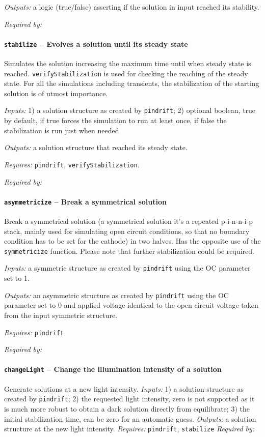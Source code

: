 \textit{Outputs:} a logic (true/false) asserting if the solution in input reached its stability.


\textit{Required by:} 

		\paragraph{\texttt{stabilize} -- Evolves a solution until its steady state}
Simulates the solution increasing the maximum time until when steady state is reached. 
\texttt{verifyStabilization} is used for checking the reaching of the steady state.
For all the simulations including transients, the stabilization of the starting solution is of utmost importance.

\textit{Inputs:} 1) a solution structure as created by \texttt{pindrift};
   2) optional boolean, true by default, 
     if true forces the simulation to run at least once, if false the
     stabilization is run just when needed.
     
\textit{Outputs:} a solution structure that reached its steady state.

\textit{Requires:} \texttt{pindrift}, \texttt{verifyStabilization}.

\textit{Required by:} 

		\paragraph{\texttt{asymmetricize} -- Break a symmetrical solution}
		Break a symmetrical solution (a symmetrical solution it's a repeated p-i-n-n-i-p stack, mainly used for simulating open circuit conditions, so that no boundary condition has to be set for the cathode) in two halves. Has the opposite use of the \texttt{symmetricize} function.
		Please note that further stabilization could be required.
		
		\textit{Inputs:} a symmetric structure as created by \texttt{pindrift} using the OC parameter set to 1.
		
		\textit{Outputs:} an asymmetric structure as created by \texttt{pindrift} using the OC
		     parameter set to 0 and applied voltage identical to the open circuit
		     voltage taken from the input symmetric structure.
		     
	\textit{Requires:} \texttt{pindrift}
	
	\textit{Required by:} 

		\paragraph{\texttt{changeLight} -- Change the illumination intensity of a solution}
		Generate solutions at a new light intensity.
		\textit{Inputs:} 1) a solution structure as created by \texttt{pindrift};
		2) the requested light intensity, zero is not supported as it is
		    much more robust to obtain a dark solution directly from equilibrate;
		3) the initial stabilization time, can be zero for an automatic
		     guess.
		\textit{Outputs:} a solution structure at the new light intensity.
		\textit{Requires:} \texttt{pindrift}, \texttt{stabilize}
			\textit{Required by:} 
			
